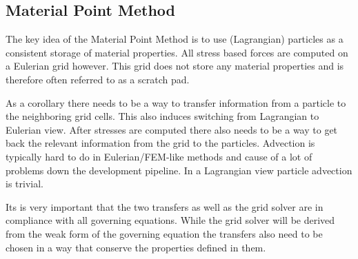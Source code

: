 \documentclass[m,times]{cgMA}
\begin{document}
\subsection{Material Point Method}\label{sec:mat_point}
The key idea of the Material Point Method is to use (Lagrangian) particles as a consistent storage of material properties. All stress based forces are computed on a Eulerian grid however. This grid does not store any material properties and is therefore often referred to as a scratch pad.

As a corollary there needs to be a way to transfer information from a particle to the neighboring grid cells. This also induces switching from Lagrangian to Eulerian view. After stresses are computed there also needs to be a way to get back the relevant information from the grid to the particles. Advection is typically hard to do in Eulerian/FEM-like methods and cause of a lot of problems down the development pipeline. In a Lagrangian view particle advection is trivial.

Its is very important that the two transfers as well as the grid solver are in compliance with all governing equations. While the grid solver will be derived from the weak form of the governing equation the transfers also need to be chosen in a way that conserve the properties defined in them.
\cite{MPM:COURSE}
\end{document}
